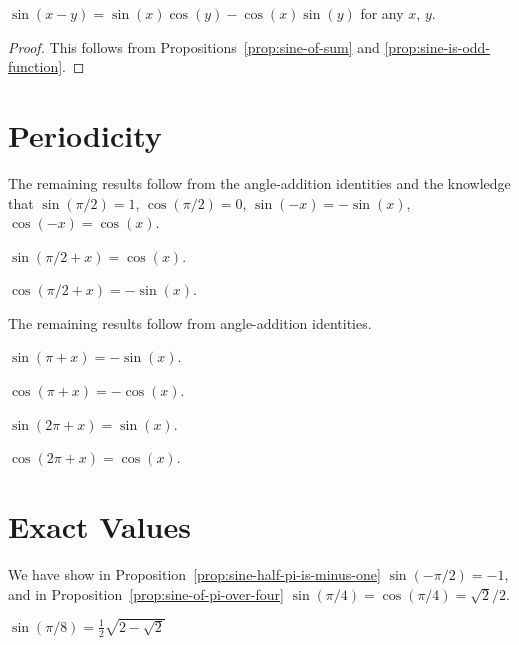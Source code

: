 \begin{proposition}
$\sin(x-y) = \sin(x)\cos(y) - \cos(x)\sin(y)$ for any $x$, $y$.
\end{proposition}

\begin{proof}
This follows from Propositions~\ref{prop:sine-of-sum} and \ref{prop:sine-is-odd-function}.
\end{proof}

\section{Periodicity}

The remaining results follow from the angle-addition identities and the
knowledge that $\sin(\pi/2)=1$, $\cos(\pi/2)=0$, $\sin(-x)=-\sin(x)$, $\cos(-x)=\cos(x)$.

\begin{proposition}
$\sin(\pi/2 + x) = \cos(x)$.
\end{proposition}

\begin{proposition}
$\cos(\pi/2 + x) = -\sin(x)$.
\end{proposition}

The remaining results follow from angle-addition identities.

\begin{proposition}
$\sin(\pi + x) = -\sin(x)$.
\end{proposition}

\begin{proposition}
$\cos(\pi + x) = -\cos(x)$.
\end{proposition}

\begin{proposition}
$\sin(2\pi + x) = \sin(x)$.
\end{proposition}

\begin{proposition}
$\cos(2\pi + x) = \cos(x)$.
\end{proposition}

\section{Exact Values}

We have show in Proposition~\ref{prop:sine-half-pi-is-minus-one} $\sin(-\pi/2)=-1$,
and in Proposition~\ref{prop:sine-of-pi-over-four} $\sin(\pi/4)=\cos(\pi/4)=\sqrt{2}/2$.

\begin{proposition}
$\displaystyle{\sin(\pi/8) = \frac{1}{2}\sqrt{2 - \sqrt{2}}}$
\end{proposition}

